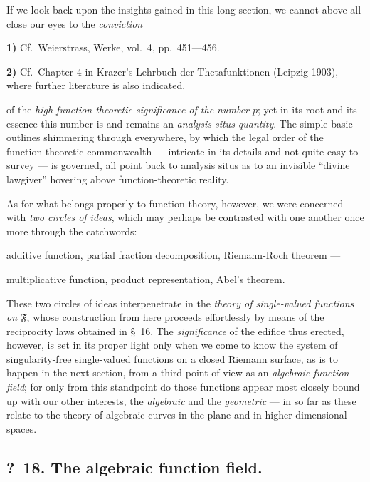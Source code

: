 \documentclass{article}
\begin{document}
If we look back upon the insights gained in this long section, we cannot above all close our eyes to the \emph{conviction}

\textbf{1)} Cf.\ Weierstrass, Werke, vol.~4, pp.~451---456.

\textbf{2)} Cf.\ Chapter 4 in Krazer's Lehrbuch der Thetafunktionen (Leipzig 1903), where further literature is also indicated.

of the \emph{high function-theoretic significance of the number $p$}; yet in its root and its essence this number is and remains an \emph{analysis-situs quantity}. The simple basic outlines shimmering through everywhere, by which the legal order of the function-theoretic commonwealth --- intricate in its details and not quite easy to survey --- is governed, all point back to analysis situs as to an invisible ``divine lawgiver'' hovering above function-theoretic reality.

As for what belongs properly to function theory, however, we were concerned with \emph{two circles of ideas}, which may perhaps be contrasted with one another once more through the catchwords:

additive function, partial fraction decomposition, Riemann-Roch theorem ---

multiplicative function, product representation, Abel's theorem.

These two circles of ideas interpenetrate in the \emph{theory of single-valued functions on $\mathfrak{F}$}, whose construction from here proceeds effortlessly by means of the reciprocity laws obtained in §~16. The \emph{significance} of the edifice thus erected, however, is set in its proper light only when we come to know the system of singularity-free single-valued functions on a closed Riemann surface, as is to happen in the next section, from a third point of view as an \emph{algebraic function field}; for only from this standpoint do those functions appear most closely bound up with our other interests, the \emph{algebraic} and the \emph{geometric} --- in so far as these relate to the theory of algebraic curves in the plane and in higher-dimensional spaces.

\subsection*{?~18. The algebraic function field.}
\end{document}

